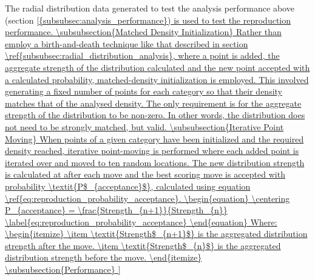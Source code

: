 The radial distribution data generated to test the analysis performance above (section \ref{{subsubsec:analysis_performance}) is used to test the reproduction performance.

\subsubsection{Matched Density Initialization}

Rather than employ a birth-and-death technique like that described in section \ref{subsubsec:radial_distribution_analysis}, where a point is added, the aggregate strength of the distribution calculated and the new point accepted with a calculated probability, matched-density initialization is employed. This involved generating a fixed number of points for each category so that their density matches that of the analysed density. The only requirement is for the aggregate strength of the distribution to be non-zero. In other words, the distribution does not need to be strongly matched, but valid.

\subsubsection{Iterative Point Moving}

When points of a given category have been initialized and the required density reached, iterative point-moving is performed where each added point is iterated over and moved to ten random locations. The new distribution strength is calculated at after each move and the best scoring move is accepted with probability \textit{P$_{acceptance}$}, calculated using equation \ref{eq:reproduction_probability_acceptance}. 

\begin{equation}
\centering
P_{acceptance} = \frac{Strength_{n+1}}{Strength_{n}}
\label{eq:reproduction_probability_acceptance}
\end{equation}
Where:
\begin{itemize}
\item \textit{Strength$_{n+1}$} is the aggregated distribution strength after the move.
\item \textit{Strength$_{n}$} is the aggregated distribution strength before the move.
\end{itemize}

\subsubsection{Performance}

}
